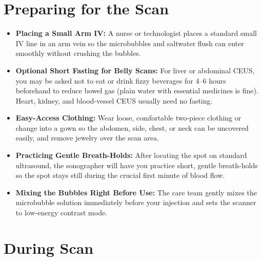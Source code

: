 \section{Preparing for the Scan}

\begin{itemize}
    \item \textbf{Placing a Small Arm IV:} A nurse or technologist places a standard small IV line in an arm vein so the microbubbles and saltwater flush can enter smoothly without crushing the bubbles.
    \item \textbf{Optional Short Fasting for Belly Scans:} For liver or abdominal CEUS, you may be asked not to eat or drink fizzy beverages for 4--6 hours beforehand to reduce bowel gas (plain water with essential medicines is fine). Heart, kidney, and blood-vessel CEUS usually need no fasting.
    \item \textbf{Easy-Access Clothing:} Wear loose, comfortable two-piece clothing or change into a gown so the abdomen, side, chest, or neck can be uncovered easily, and remove jewelry over the scan area.
    \item \textbf{Practicing Gentle Breath-Holds:} After locating the spot on standard ultrasound, the sonographer will have you practice short, gentle breath-holds so the spot stays still during the crucial first minute of blood flow.
    \item \textbf{Mixing the Bubbles Right Before Use:} The care team gently mixes the microbubble solution immediately before your injection and sets the scanner to low-energy contrast mode.
\end{itemize}

\section{During Scan}

